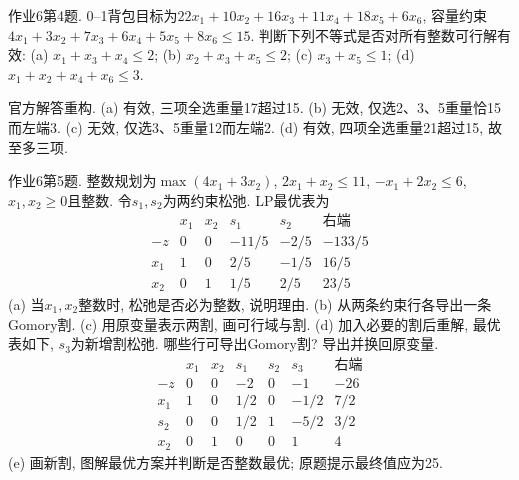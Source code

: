 \begin{exercise}\label{ass:15053-ps6-q4}
作业6第4题. 0--1背包目标为$22x_1+10x_2+16x_3+11x_4+18x_5+6x_6$, 容量约束$4x_1+3x_2+7x_3+6x_4+5x_5+8x_6\le15$. 判断下列不等式是否对所有整数可行解有效: (a) $x_1+x_3+x_4\le2$; (b) $x_2+x_3+x_5\le2$; (c) $x_3+x_5\le1$; (d) $x_1+x_2+x_4+x_6\le3$.
\end{exercise}
\begin{solution}
官方解答重构. (a) 有效, 三项全选重量17超过15. (b) 无效, 仅选2、3、5重量恰15而左端3. (c) 无效, 仅选3、5重量12而左端2. (d) 有效, 四项全选重量21超过15, 故至多三项.
\end{solution}

\begin{exercise}\label{ass:15053-ps6-q5}
作业6第5题. 整数规划为$\max(4x_1+3x_2)$, $2x_1+x_2\le11$, $-x_1+2x_2\le6$, $x_1,x_2\ge0$且整数. 令$s_1,s_2$为两约束松弛. LP最优表为
\[
\begin{array}{c|rrrr|r}
 &x_1&x_2&s_1&s_2&\text{右端}\\\hline
-z&0&0&-11/5&-2/5&-133/5\\
x_1&1&0&2/5&-1/5&16/5\\
x_2&0&1&1/5&2/5&23/5
\end{array}
\]
(a) 当$x_1,x_2$整数时, 松弛是否必为整数, 说明理由. (b) 从两条约束行各导出一条Gomory割. (c) 用原变量表示两割, 画可行域与割. (d) 加入必要的割后重解, 最优表如下, $s_3$为新增割松弛. 哪些行可导出Gomory割? 导出并换回原变量.
\[
\begin{array}{c|rrrrr|r}
 &x_1&x_2&s_1&s_2&s_3&\text{右端}\\\hline
-z&0&0&-2&0&-1&-26\\
x_1&1&0&1/2&0&-1/2&7/2\\
s_2&0&0&1/2&1&-5/2&3/2\\
x_2&0&1&0&0&1&4
\end{array}
\]
(e) 画新割, 图解最优方案并判断是否整数最优; 原题提示最终值应为25.
\end{exercise}
